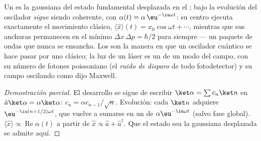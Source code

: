 \begin{proposition}\label{prop:b3:harmonic-oscillator:coherent-motion}
Un  es la gaussiana del estado fundamental desplazada en el
; bajo la evolución del oscilador \emph{sigue} siendo
coherente, con $\alpha(t) = \alpha\,\eu^{-\iu\omega t}$: su centro ejecuta
exactamente el movimiento clásico, $\langle\hat x\rangle(t) =
x_0\cos\omega t + \cdots$, mientras que sus anchuras permanecen en el mínimo
$\Delta x\,\Delta p = \hbar/2$ para siempre --- un paquete de ondas que
nunca se ensancha. Los  son la manera en que un oscilador
cuántico se hace pasar por uno clásico; la luz de un láser es un  de un modo del campo, con su número de fotones poissoniano (el
\emph{ruido de disparo} de todo fotodetector) y su campo oscilando como dijo
Maxwell.
\end{proposition}

\begin{proof}[Demostración parcial]
El desarrollo se sigue de escribir $\ket\alpha = \sum c_n\ket n$ en
$\hat a\ket\alpha = \alpha\ket\alpha$: $c_n = \alpha c_{n-1}/\sqrt
n$. Evolución: cada $\ket n$ adquiere $\eu^{-\iu(n + 1/2)\omega t}$,
que vuelve a sumarse en un  de $\alpha\eu^{-\iu\omega t}$
(salvo fase global). $\langle\hat x\rangle \propto
\operatorname{Re}\alpha(t)$ a partir de $\hat x \propto \hat a +
\hat a^\dagger$. Que el estado sea la gaussiana desplazada se admite aquí.
\end{proof}

